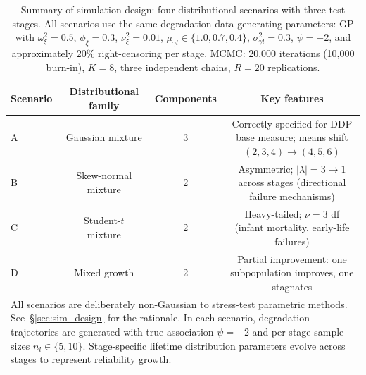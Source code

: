 \documentclass[a4paper,fleqn,longmktitle]{cas-sc}
\begin{document}
\begin{table}[h]
\centering
\caption{Summary of simulation design: four distributional scenarios with three test stages. All scenarios use the same degradation data-generating parameters: GP with $\omega_\xi^2 = 0.5$, $\phi_\xi = 0.3$, $\nu_\xi^2 = 0.01$, $\mu_{\gamma l} \in \{1.0, 0.7, 0.4\}$, $\sigma_{\gamma l}^2 = 0.3$, $\psi = -2$, and approximately 20\% right-censoring per stage. MCMC: 20,000 iterations (10,000 burn-in), $K=8$, three independent chains, $R=20$ replications.}
\label{tab:sim_design}
\begin{tabular}{lccc}
\toprule
Scenario & Distributional family & Components & Key features \\
\midrule
A & Gaussian mixture & 3 & Correctly specified for DDP base measure; means shift $(2,3,4)\to(4,5,6)$ \\
B & Skew-normal mixture & 2 & Asymmetric; $|\lambda|=3\to1$ across stages (directional failure mechanisms) \\
C & Student-$t$ mixture & 2 & Heavy-tailed; $\nu=3$ df (infant mortality, early-life failures) \\
D & Mixed growth & 2 & Partial improvement: one subpopulation improves, one stagnates \\
\midrule
\multicolumn{4}{p{\textwidth}}{\footnotesize All scenarios are deliberately non-Gaussian to stress-test parametric methods. See~\S\ref{sec:sim_design} for the rationale. In each scenario, degradation trajectories are generated with true association $\psi=-2$ and per-stage sample sizes $n_l\in\{5,10\}$. Stage-specific lifetime distribution parameters evolve across stages to represent reliability growth.}
\end{tabular}
\end{table}
\end{document}
